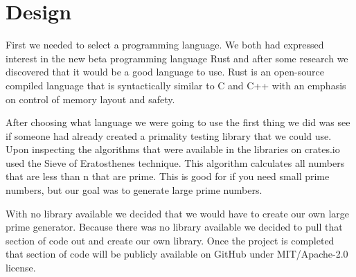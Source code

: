 \documentclass[11pt,technote]{IEEEtran}
\begin{document}
\section{Design}
First we needed to select a programming language. We both had expressed 
interest in the new beta programming language Rust and after some research we 
discovered that it would be a good language to use. Rust is an open-source 
compiled language that is syntactically similar to C and C++ with an emphasis on 
control of memory layout and safety.  

\par After choosing what language we were going to use the first thing we did 
was see if someone had already created a primality testing library that we could 
use. Upon inspecting the algorithms that were available in the libraries on 
crates.io used the Sieve of Eratosthenes technique. This algorithm calculates 
all numbers that are less than n that are prime. This is good for if you need 
small prime numbers, but our goal was to generate large prime numbers. 

\par With no library available we decided that we would have to create our own 
large prime generator. Because there was no library available we decided to pull 
that section of code out and create our own library. Once the project is 
completed that section of code will be publicly available on GitHub under 
MIT/Apache-2.0 license.
\end{document}
